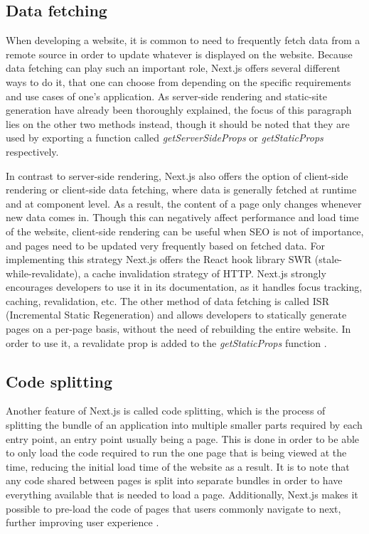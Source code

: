\subsection{Data fetching}
When developing a website, it is common to need to frequently fetch data from a remote source in order to update whatever is displayed
on the website. Because data fetching can play such an important role, Next.js offers several different ways to do it, that one can choose
from depending on the specific requirements and use cases of one's application. As server-side rendering and static-site generation have already
been thoroughly explained, the focus of this paragraph lies on the other two methods instead, though it should be noted that they are used by
exporting a function called \emph{getServerSideProps} or \emph{getStaticProps} respectively.

In contrast to server-side rendering, Next.js also offers the
option of client-side rendering or client-side data fetching, where data is generally fetched at runtime and at component level. As a
result, the content of a page only changes whenever new data comes in. Though this can negatively affect performance and load time of the
website, client-side rendering can be useful when SEO is not of importance, and pages need to be updated very frequently based on fetched data.
For implementing this strategy Next.js offers the React hook library SWR (stale-while-revalidate), a cache invalidation strategy
of HTTP. Next.js strongly encourages developers to use it in its documentation, as it handles focus tracking, caching, revalidation, etc. The
other method of data fetching is called ISR (Incremental Static Regeneration) and allows developers to statically generate pages on a
per-page basis, without the need of rebuilding the entire website. In order to use it, a revalidate prop is added to the \emph{getStaticProps} function \cite{NextjsDataFetching}.

\subsection{Code splitting}
Another feature of Next.js is called code splitting, which is the process of splitting the bundle of an application into multiple smaller parts
required by each entry point, an entry point usually being a page. This is done in order to be able to only load the code required to run the one
page that is being viewed at the time, reducing the initial load time of the website as a result. It is to note that any code shared between pages
is split into separate bundles in order to have everything available that is needed to load a page. Additionally, Next.js makes it possible to
pre-load the code of pages that users commonly navigate to next, further improving user experience \cite{NextjsCodeSplitting}.

